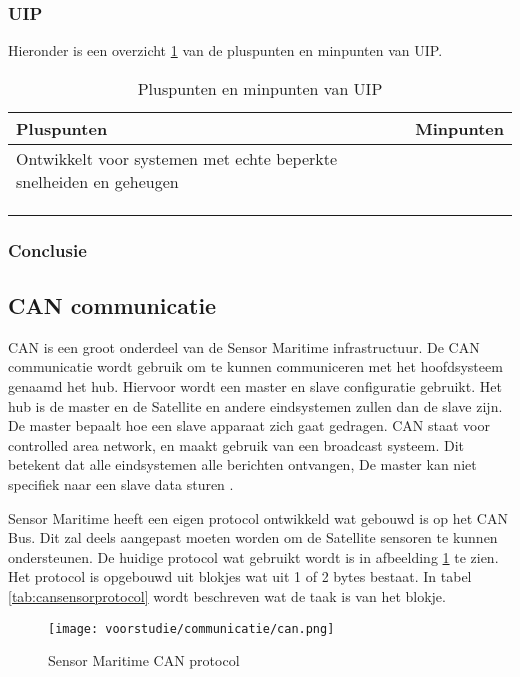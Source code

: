 \newpage
\subsubsection{UIP}
Hieronder is een overzicht \ref{tab:uipoverzicht} van de pluspunten en minpunten van UIP.
\begin{table}[h!]
	\caption{Pluspunten en minpunten van UIP}
	\begin{tabular}{p{8cm}p{8cm}}
	\toprule
	Pluspunten & Minpunten \\ \midrule
	Ontwikkelt voor systemen met echte beperkte snelheiden en geheugen \autocite{lwipuip} &           \\
			   															&           \\
			   															&           \\
			   															&           \\ \bottomrule
	\end{tabular}
	
	\label{tab:uipoverzicht}
\end{table}

\subsubsection{Conclusie}

\newpage
\subsection{CAN communicatie}
CAN is een groot onderdeel van de Sensor Maritime infrastructuur. De CAN communicatie wordt gebruik om te kunnen communiceren met het hoofdsysteem genaamd het hub. Hiervoor wordt een master en slave configuratie gebruikt. Het hub is de master en de Satellite en andere eindsystemen zullen dan de slave zijn. De master bepaalt hoe een slave apparaat zich gaat gedragen. CAN staat voor controlled area network, en maakt gebruik van een broadcast systeem. Dit betekent dat alle eindsystemen alle berichten ontvangen, De master kan niet specifiek naar een slave data sturen \autocite{can}. \newline

\noindent Sensor Maritime heeft een eigen protocol ontwikkeld wat gebouwd is op het CAN Bus. Dit zal deels aangepast moeten worden om de Satellite sensoren te kunnen ondersteunen. De huidige protocol wat gebruikt wordt is in afbeelding \ref{fig:canprotocol} te zien. Het protocol is opgebouwd uit blokjes wat uit 1 of 2 bytes bestaat. In tabel \ref{tab:cansensorprotocol} wordt beschreven wat de taak is van het blokje. 
\begin{figure}[h!]
	\label{fig:canprotocol}
	\caption{Sensor Maritime CAN protocol}
	\texttt{[image: voorstudie/communicatie/can.png]}
\end{figure}

